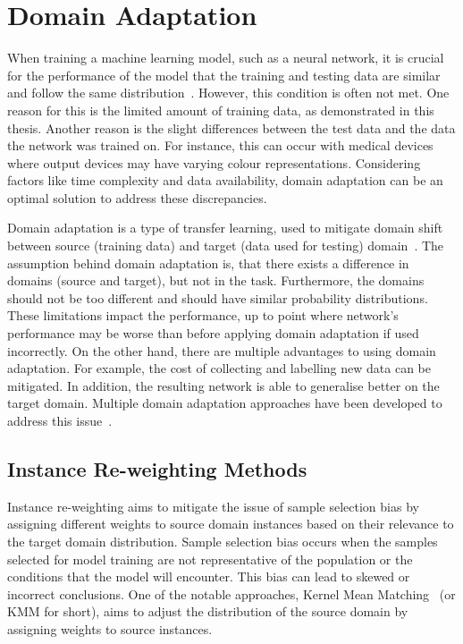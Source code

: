 \section{Domain Adaptation}
When training a machine learning model, such as a neural network, it is crucial for the performance of the model that the training and testing data are similar and follow the same distribution~\cite{domainAdaptation}. However, this condition is often not met. One reason for this is the limited amount of training data, as demonstrated in this thesis. Another reason is the slight differences between the test data and the data the network was trained on. For instance, this can occur with medical devices where output devices may have varying colour representations. Considering factors like time complexity and data availability, domain adaptation can be an optimal solution to address these discrepancies.

Domain adaptation is a type of transfer learning, used to mitigate domain shift between source (training data) and target (data used for testing) domain~\cite{domainAdaptation}.
The assumption behind domain adaptation is, that there exists a difference in domains (source and target), but not in the task. Furthermore, the domains should not be too different and should have similar probability distributions. These limitations impact the performance, up to point where network's performance may be worse than before applying domain adaptation if used incorrectly. On the other hand, there are multiple advantages to using domain adaptation. For example, the cost of collecting and labelling new data can be mitigated. In addition, the resulting network is able to generalise better on the target domain. Multiple domain adaptation approaches have been developed to address this issue~\cite{domainAdaptationGod}.

\subsection{Instance Re-weighting Methods}
\label{Instance}
  Instance re-weighting aims to mitigate the issue of sample selection bias by assigning different weights to source domain instances based on their relevance to the target domain distribution. Sample selection bias occurs when the samples selected for model training are not representative of the population or the conditions that the model will encounter.  This bias can lead to skewed or incorrect conclusions. One of the notable approaches, Kernel Mean Matching~\cite{instanceMethod} (or KMM for short),  aims to adjust the distribution of the source domain by assigning weights to source instances. 
 

